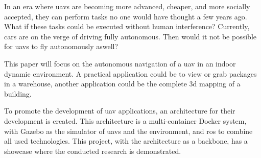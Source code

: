 In an era where \acsp{uav} are becoming more advanced, cheaper, and more socially accepted, they can perform tasks no one would have thought a few years ago. What if these tasks could be executed without human interference? Currently, cars are on the verge of driving fully autonomous. Then would it not be possible for \acsp{uav} to fly autonomously aswell?

This paper will focus on the autonomous navigation of a \acs{uav} in an indoor dynamic environment. A practical application could be to view or grab packages in a warehouse, another application could be the complete \acs{3d} mapping of a building.

To promote the development of \acs{uav} applications, an architecture for their development is created. This architecture is a multi\hyp{}container Docker system, with Gazebo as the simulator of \acsp{uav} and the environment, and \acs{ros} to combine all used technologies. This project, with the architecture as a backbone, has a showcase where the conducted research is demonstrated.